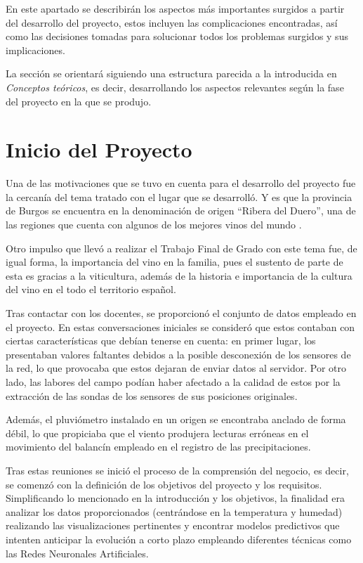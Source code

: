 
En este apartado se describirán los aspectos más importantes surgidos a partir del desarrollo del proyecto,
estos incluyen las complicaciones encontradas, así como las decisiones tomadas para solucionar todos los
problemas surgidos y sus implicaciones.

La sección se orientará siguiendo una estructura parecida a la introducida en \textit{Conceptos teóricos}, 
es decir, desarrollando los aspectos relevantes según la fase del proyecto en la que se produjo.

\section{Inicio del Proyecto}
Una de las motivaciones que se tuvo en cuenta para el desarrollo del proyecto fue la cercanía del tema tratado
con el lugar que se desarrolló. Y es que la provincia de Burgos se encuentra en la denominación de
origen ``Ribera del Duero'', una de las regiones que cuenta con algunos de los mejores vinos del mundo \cite{misc:abc2021}.

Otro impulso que llevó a realizar el Trabajo Final de Grado con este tema fue, de igual forma, la importancia 
del vino en la familia, pues el sustento de parte de esta es gracias a la viticultura, además de la historia
e importancia de la cultura del vino en el todo el territorio español.

Tras contactar con los docentes, se proporcionó el conjunto de datos empleado en el proyecto. En estas conversaciones
iniciales se consideró que estos contaban con ciertas características que debían tenerse en cuenta: en primer lugar,
los presentaban valores faltantes debidos a la posible desconexión de los sensores de la red, lo que provocaba
que estos dejaran de enviar datos al servidor. Por otro lado, las labores del campo podían haber afectado a la calidad
de estos por la extracción de las sondas de los sensores de sus posiciones originales.

Además, el pluviómetro instalado en un origen se encontraba anclado de forma débil, lo que propiciaba que el viento 
produjera lecturas erróneas en el movimiento del balancín empleado en el registro de las precipitaciones.

Tras estas reuniones se inició el proceso de la comprensión del negocio, es decir, se comenzó con la definición de los 
objetivos del proyecto y los requisitos. Simplificando lo mencionado en la introducción y los objetivos,
la finalidad era analizar los datos proporcionados (centrándose en la temperatura y humedad) realizando
las visualizaciones pertinentes y encontrar modelos predictivos que intenten anticipar la evolución a corto plazo
empleando diferentes técnicas como las Redes Neuronales Artificiales.

